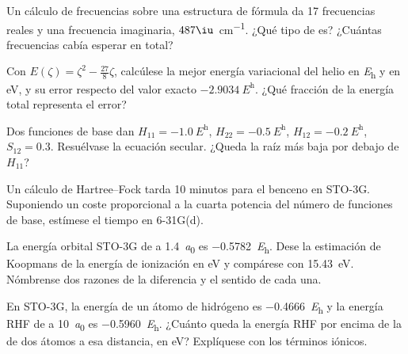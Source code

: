 \begin{exercise}[$\star$]\label{exo:b3:computational-chemistry:4}
Un cálculo de frecuencias sobre una estructura de fórmula  da 17 frecuencias
reales y una frecuencia imaginaria, $487\iu$~\unit{cm^{-1}}. ¿Qué tipo de
 es? ¿Cuántas frecuencias cabía esperar en total?
\end{exercise}

\begin{exercise}[$\star\star$]\label{exo:b3:computational-chemistry:5}
Con $E(\zeta) = \zeta^2 - \frac{27}{8}\zeta$, calcúlese la mejor energía variacional
del helio en \unit{\hartree} y en eV, y su error respecto del valor exacto
$\qty{-2.9034}{\hartree}$. ¿Qué fracción de la energía total representa el error?
\end{exercise}

\begin{exercise}[$\star\star$]\label{exo:b3:computational-chemistry:6}
Dos funciones de base dan $H_{11} = \qty{-1.0}{\hartree}$, $H_{22} =
\qty{-0.5}{\hartree}$, $H_{12} = \qty{-0.2}{\hartree}$, $S_{12} = 0.3$. Resuélvase la
ecuación secular. ¿Queda la raíz más baja por debajo de $H_{11}$?
\end{exercise}

\begin{exercise}[$\star\star$]\label{exo:b3:computational-chemistry:7}
Un cálculo de Hartree--Fock tarda 10 minutos para el benceno en STO-3G. Suponiendo
un coste proporcional a la cuarta potencia del número de funciones de base,
estímese el tiempo en 6-31G(d).
\end{exercise}

\begin{exercise}[$\star\star$]\label{exo:b3:computational-chemistry:8}
La energía orbital STO-3G de  a \qty{1.4}{\bohr} es
\qty{-0.5782}{\hartree}. Dese la estimación de Koopmans de la energía de ionización en eV
y compárese con \qty{15.43}{eV}. Nómbrense dos razones de la diferencia y el sentido
de cada una.
\end{exercise}

\begin{exercise}[$\star\star$]\label{exo:b3:computational-chemistry:9}
En STO-3G, la energía de un átomo de hidrógeno es \qty{-0.4666}{\hartree} y la energía
RHF de  a \qty{10}{\bohr} es \qty{-0.5960}{\hartree}. ¿Cuánto queda la energía RHF
por encima de la de dos átomos a esa distancia, en eV? Explíquese con los términos
iónicos.
\end{exercise}

